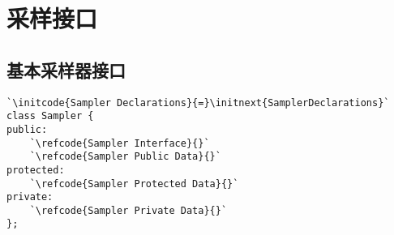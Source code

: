 \section{采样接口}\label{sec:采样接口}

\subsection{基本采样器接口}\label{sub:基本采样器接口}
\label{code:overview_Sampler}
\begin{lstlisting}
`\initcode{Sampler Declarations}{=}\initnext{SamplerDeclarations}`
class Sampler {
public:
    `\refcode{Sampler Interface}{}`
    `\refcode{Sampler Public Data}{}`
protected:
    `\refcode{Sampler Protected Data}{}`
private:
    `\refcode{Sampler Private Data}{}`
};
\end{lstlisting}